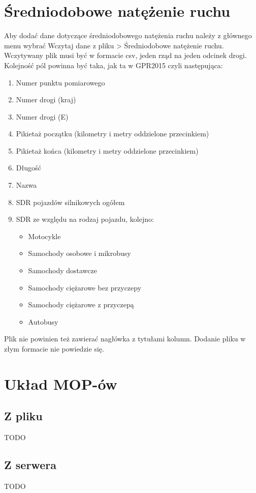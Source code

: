 \documentclass[10pt,paper=a4 BCOR0, DIV15, titlepage=false, oneside]{scrbook} %
\begin{document}
      \section{Średniodobowe natężenie ruchu}
        Aby dodać dane dotyczące średniodobowego natężenia ruchu należy z
        głównego menu wybrać Wczytaj dane z pliku > Średniodobowe natężenie
        ruchu. Wczytywany plik musi być w formacie csv, jeden rząd na jeden
        odcinek drogi. Kolejność pól powinna być taka, jak ta w GPR2015 czyli następująca:
        \begin{enumerate}
          \item Numer punktu pomiarowego
          \item Numer drogi (kraj)
          \item Numer drogi (E)
          \item Pikietaż początku (kilometry i metry oddzielone przecinkiem)
          \item Pikietaż końca (kilometry i metry oddzielone przecinkiem)
          \item Długość
          \item Nazwa
          \item SDR pojazdów silnikowych ogółem 
          \item SDR ze względu na rodzaj pojazdu, kolejno:
          \begin{itemize}
            \item Motocykle
            \item Samochody osobowe i mikrobusy
            \item Samochody dostawcze
            \item Samochody ciężarowe bez przyczepy
            \item Samochody ciężarowe z przyczepą
            \item Autobusy 
          \end{itemize}
        \end{enumerate}
        Plik nie powinien też zawierać nagłówka z tytułami kolumn. Dodanie
        pliku w złym formacie nie powiedzie się.

        \section{Układ MOP-ów}
        \subsection{Z pliku} TODO
        \subsection{Z serwera} TODO
\end{document}
